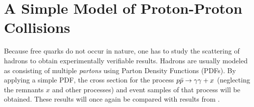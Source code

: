 \chapter{A Simple Model of Proton-Proton Collisions}%
\label{chap:pdf}

Because free quarks do not occur in nature, one has to study the
scattering of hadrons to obtain experimentally verifiable
results. Hadrons are usually modeled as consisting of multiple
\emph{partons} using Parton Density Functions (PDFs). By applying a
simple PDF, the cross section for the process \(p\bar{p}\rightarrow\gamma\gamma + x\) (neglecting
the remnants \(x\) and other processes) and event samples of that
process will be obtained. These results will once again be compared
with results from \sherpa.

